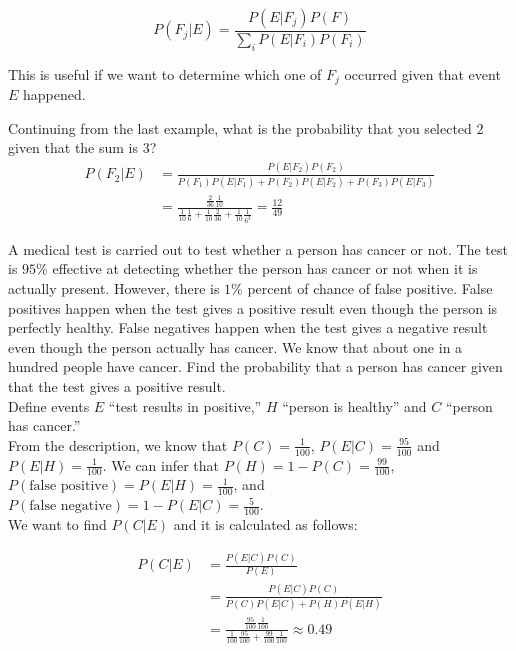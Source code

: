 \documentclass[12pt, a4paper]{article}
\newcounter{exa}
\begin{document}
$$P(F_j|E)=\frac{P(E|F_j)P(F)}{\sum_i P(E|F_i) P(F_i)}$$

This is useful if we want to determine which one of $F_j$ occurred given that event $E$ happened.

\begin{texample}
Continuing from the last example, what is the probability that you selected $2$ given that the sum is $3$? \\

\begin{align*}
P(F_2|E)&=\frac{P(E|F_2)P(F_2)}{P(F_1)P(E|F_1)+P(F_2)P(E|F_2)+P(F_3)P(E|F_3)} \\
&=\frac{\frac{2}{36}\frac{1}{10}}{\frac{1}{10}\frac16 + \frac{1}{10}\frac{2}{36}+\frac{1}{10}\frac{1}{6^3}}=\frac{12}{49}
\end{align*}
\end{texample}

\begin{texample}
A medical test is carried out to test whether a person has cancer or not. The test is $95\%$ effective at detecting whether the person has cancer or not when it is actually present. However, there is $1\%$ percent of chance of false positive. False positives happen when the test gives a positive result even though the person is perfectly healthy. False negatives happen when the test gives a negative result even though the person actually has cancer. We know that about one in a hundred people have cancer. Find the probability that a person has cancer given that the test gives a positive result. \\

Define events $E$ ``test results in positive,'' $H$ ``person is healthy'' and $C$ ``person has cancer.'' \\

From the description, we know that $P(C)=\frac{1}{100}$, $P(E|C)=\frac{95}{100}$ and $P(E|H)=\frac{1}{100}$. We can infer that $P(H)=1-P(C)=\frac{99}{100}$, $P(\text{false positive})=P(E|H)=\frac{1}{100}$, and $P(\text{false negative})=1-P(E|C)=\frac{5}{100}$. \\

We want to find $P(C|E)$ and it is calculated as follows:

\begin{align*}
P(C|E)&=\frac{P(E|C)P(C)}{P(E)} \\
&=\frac{P(E|C)P(C)}{P(C)P(E|C)+P(H)P(E|H)} \\
&=\frac{\frac{95}{100}\frac{1}{100}}{\frac{1}{100}\frac{95}{100}+\frac{99}{100}\frac{1}{100}} \approx 0.49
\end{align*}
\end{texample}
\end{document}
